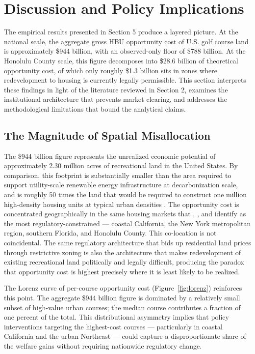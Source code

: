 \documentclass[11pt, letterpaper]{article}
\begin{document}
\newpage

\section{Discussion and Policy Implications}

The empirical results presented in Section 5 produce a layered picture. At the national scale, the aggregate gross HBU opportunity cost of U.S. golf course land is approximately \$944 billion, with an observed-only floor of \$788 billion. At the Honolulu County scale, this figure decomposes into \$28.6 billion of theoretical opportunity cost, of which only roughly \$1.3 billion sits in zones where redevelopment to housing is currently legally permissible. This section interprets these findings in light of the literature reviewed in Section 2, examines the institutional architecture that prevents market clearing, and addresses the methodological limitations that bound the analytical claims.

\subsection{The Magnitude of Spatial Misallocation}

The \$944 billion figure represents the unrealized economic potential of approximately 2.30 million acres of recreational land in the United States. By comparison, this footprint is substantially smaller than the area required to support utility-scale renewable energy infrastructure at decarbonization scale, and is roughly 50 times the land that would be required to construct one million high-density housing units at typical urban densities \parencite{Weinand2025}. The opportunity cost is concentrated geographically in the same housing markets that \textcite{Glaeser2005}, \textcite{Davis2021}, and \textcite{Gyourko2021} identify as the most regulatory-constrained --- coastal California, the New York metropolitan region, southern Florida, and Honolulu County. This co-location is not coincidental. The same regulatory architecture that bids up residential land prices through restrictive zoning is also the architecture that makes redevelopment of existing recreational land politically and legally difficult, producing the paradox that opportunity cost is highest precisely where it is least likely to be realized.

The Lorenz curve of per-course opportunity cost (Figure~\ref{fig:lorenz}) reinforces this point. The aggregate \$944 billion figure is dominated by a relatively small subset of high-value urban courses; the median course contributes a fraction of one percent of the total. This distributional asymmetry implies that policy interventions targeting the highest-cost courses --- particularly in coastal California and the urban Northeast --- could capture a disproportionate share of the welfare gains without requiring nationwide regulatory change.
\end{document}
